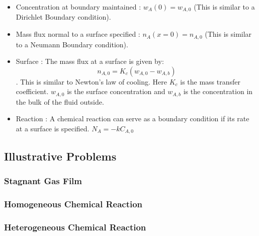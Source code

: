 \begin{itemize}

    \item Concentration at boundary maintained : $w_{A}(0) = w_{A,0}$ (This is similar to a Dirichlet Boundary condition).

    \item Mass flux normal to a surface specified : $n_{A}(x=0) = n_{A, 0}$ (This is similar to a Neumann Boundary condition).

    \item Surface : The mass flux at a surface is given by: $$n_{A, 0} = K_{c} (w_{A,0} - w_{A,b})$$. This is similar to Newton's law of cooling. Here $K_{c}$ is the mass transfer coefficient. $w_{A,0}$ is the surface concentration and $w_{A,b}$ is the concentration in the bulk of the fluid outside.

    \item Reaction : A chemical reaction can serve as a boundary condition if its rate at a surface is specified. $N_{A} = -k C_{A,0}$


\end{itemize}


\subsection{Illustrative Problems}

\subsubsection{Stagnant Gas Film}

\subsubsection{Homogeneous Chemical Reaction}

\subsubsection{Heterogeneous Chemical Reaction}
